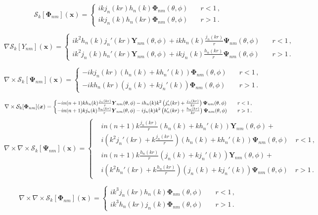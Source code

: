 \documentclass[11pt]{article}
\newcommand\bx{\boldsymbol x}
\newcommand\bY{\boldsymbol Y}
\newcommand\bPhi{\boldsymbol \Phi}
\newcommand\bPsi{\boldsymbol \Psi}
\newcommand\cS{\mathcal{S}}
\theoremstyle{definition}
\theoremstyle{remark}
\numberwithin{equation}{section}
\begin{document}
\begin{equation}
\cS_{k}[\bPhi_{nm}](\bx) = \begin{cases}
  ik j_{n}(kr) h_{n}(k) \bPhi_{nm}(\theta,\phi) \quad & r<1 \, ,\\
  ik j_{n}(k) h_{n}(kr) \bPhi_{nm}(\theta,\phi) \quad & r>1 \,.
  \end{cases}
\end{equation}

\begin{equation}
\nabla \cS_{k}[Y_{nm}](\bx) = \begin{cases} 
ik^2 h_{n}(k) j_{n}'(kr) \bY_{nm}(\theta,\phi) + ikh_{n}(k) \frac{j_{n}(kr)}{r} \bPsi_{nm}(\theta,\phi) &\quad r< 1\, ,\\
ik^2 j_{n}(k) h_{n}'(kr) \bY_{nm}(\theta,\phi) + ikj_{n}(k) \frac{h_{n}(kr)}{r} \bPsi_{nm}(\theta,\phi) &\quad r>1\, .
\end{cases}
\end{equation}

\begin{equation}
\nabla \times \cS_{k}[\bPsi_{nm}](\bx) = \begin{cases}
 -i k j_{n}(kr) \left( h_{n}(k) + kh_{n}'(k) \right) \bPhi_{nm}(\theta,\phi) &\quad r<1\, ,\\
  -i k h_{n}(kr) \left( j_{n}(k) + kj_{n}'(k) \right) \bPhi_{nm}(\theta,\phi) &\quad r>1\, .
  \end{cases}
\end{equation}

\begin{equation}
\nabla \times \cS_{k}[\bPhi_{nm}](\bx) = 
{\small 
\begin{cases}
-i n(n+1) k h_{n}(k) \frac{j_{n}(kr)}{r} \bY_{nm}(\theta,\phi) - i h_{n}(k) k^2 \left( j_{n}'(kr) + \frac{j_{n}(kr)}{kr}  \right) \bPsi_{nm}(\theta,\phi) &\quad r<1 \, , \\
-i n(n+1) k j_{n}(k) \frac{h_{n}(kr)}{r} \bY_{nm}(\theta,\phi) - i j_{n}(k) k^2 \left( h_{n}'(kr) + \frac{h_{n}(kr)}{kr}  \right) \bPsi_{nm}(\theta,\phi) &\quad r>1 \, .
\end{cases}
}
\end{equation}
\begin{equation}
\nabla \times \nabla \times \cS_{k}[\bPsi_{nm}](\bx) = \begin{cases}
& i n(n+1) k \frac{j_{n}(kr)}{r} \left( h_{n}(k) + kh_{n}'(k) \right)  \bY_{nm}(\theta,\phi) + \\
& i\left(k^2 j_{n}'(kr) + k\frac{j_{n}(kr)}{r}\right) \left( h_{n}(k) + kh_{n}'(k) \right)  \bPsi_{nm}(\theta,\phi) \quad r<1\, , \\
& i n(n+1) k \frac{h_{n}(kr)}{r} \left( j_{n}(k) + kj_{n}'(k) \right)  \bY_{nm}(\theta,\phi) + \\
& i\left(k^2 h_{n}'(kr) + k\frac{h_{n}(kr)}{r}\right) \left( j_{n}(k) + kj_{n}'(k) \right)  \bPsi_{nm}(\theta,\phi) \quad r>1\, .
\end{cases}
\end{equation}

\begin{equation}
\nabla \times \nabla \times \cS_{k}[\bPhi_{nm}](\bx) = \begin{cases}
ik^3 j_{n}(kr) h_{n}(k) \bPhi_{nm}(\theta,\phi) &\quad r<1 \,, \\
ik^3 h_{n}(kr) j_{n}(k) \bPhi_{nm}(\theta,\phi) &\quad r>1 \,.
\end{cases}
\end{equation}
\end{document}
